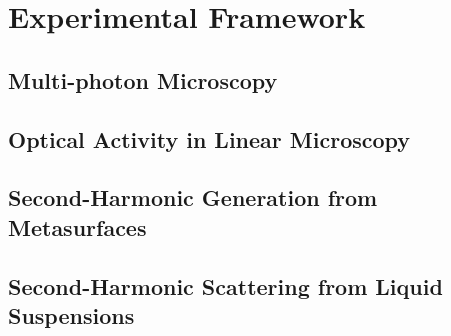 \chapter{Experimental Framework}\label{sec:Framework}

\section{Multi-photon Microscopy}

\section{Optical Activity in Linear Microscopy}

\section{Second-Harmonic Generation from Metasurfaces}

\section{Second-Harmonic Scattering from Liquid Suspensions}